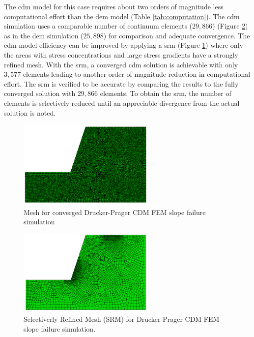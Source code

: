 The \acrshort{cdm} model for this case requires about two orders of magnitude less computational effort than the \acrshort{dem} model (Table \ref{tab:computation}). The \acrshort{cdm} simulation uses a comparable number of continuum elements ($29,866$) (Figure \ref{fig:NRM}) as in the \acrshort{dem} simulation ($25,898$) for comparison and adequate convergence. The \acrshort{cdm} model efficiency can be improved by applying a \acrfull{srm} (Figure \ref{fig:SRM}) where only the areas with stress concentrations and large stress gradients have a strongly refined mesh. With the \acrshort{srm}, a converged \acrshort{cdm} solution is achievable with only $3,577$ elements leading to another order of magnitude reduction in computational effort. The \acrshort{srm} is verified to be accurate by comparing the results to the fully converged solution with $29,866$ elements. To obtain the \acrshort{srm}, the number of elements is selectively reduced until an appreciable divergence from the actual solution is noted.  

\begin{figure}[!htb]
\begin{center}
\includegraphics[width=0.6\textwidth]{figures/Chapter5/SlopeMeshNRM}
\caption{{\label{fig:SRM} Mesh for converged Drucker-Prager CDM FEM slope failure simulation
}}
\end{center}
\end{figure}

\begin{figure}[!htb]
\begin{center}
\includegraphics[width=0.6\textwidth]{figures/Chapter5/SlopeMeshSRM}
\caption{{\label{fig:NRM} Selectiverly Refined Mesh (SRM) for Drucker-Prager CDM FEM slope failure simulation.
}}
\end{center}
\end{figure}

